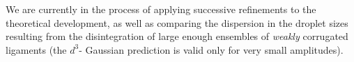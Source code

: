 We are currently in the process of applying successive refinements to the 
theoretical development, as well as comparing the dispersion in the droplet sizes 
resulting from the disintegration of large enough ensembles of \textit{weakly} corrugated 
ligaments (the $d^3$- Gaussian prediction is valid only for very small amplitudes).  


